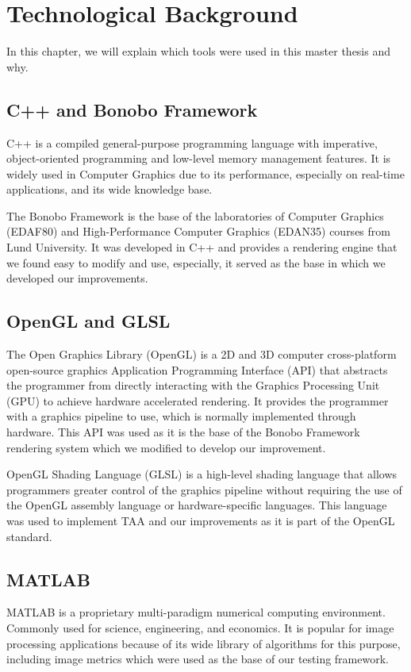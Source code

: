 \documentclass{cslthse-msc}
\begin{document}
\chapter{Technological Background}
In this chapter, we will explain which tools were used in this master thesis and why.
\section{C++ and Bonobo Framework}
C++ is a compiled general-purpose programming language with imperative, object-oriented programming and low-level memory management features. It is widely used in Computer Graphics due to its performance, especially on real-time applications, and its wide knowledge base.

The Bonobo Framework is the base of the laboratories of Computer Graphics (EDAF80) and High-Performance Computer Graphics (EDAN35) courses from Lund University. It was developed in C++ and provides a rendering engine that we found easy to modify and use, especially, it served as the base in which we developed our improvements. 

\section{OpenGL and GLSL}
The Open Graphics Library (OpenGL) is a 2D and 3D computer cross-platform open-source graphics Application Programming Interface (API) that abstracts the programmer from directly interacting with the Graphics Processing Unit (GPU) to achieve hardware accelerated rendering. It provides the programmer with a graphics pipeline to use, which is normally implemented through hardware. This API was used as it is the base of the Bonobo Framework rendering system which we modified to develop our improvement.

OpenGL Shading Language (GLSL) is a high-level shading language that allows programmers greater control of the graphics pipeline without requiring the use of the OpenGL assembly language or hardware-specific languages. This language was used to implement TAA and our improvements as it is part of the OpenGL standard.

\section{MATLAB}
MATLAB is a proprietary multi-paradigm numerical computing environment. Commonly used for science, engineering, and economics. It is popular for image processing applications because of its wide library of algorithms for this purpose, including image metrics which were used as the base of our testing framework.
\end{document}

